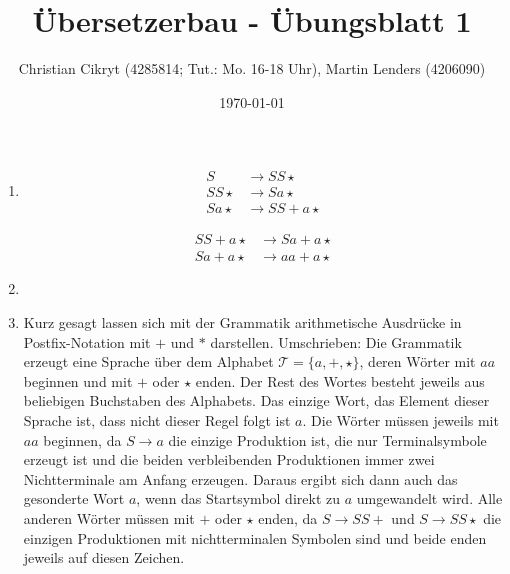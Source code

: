 \documentclass[a4paper,10pt]{scrartcl}
\title{Übersetzerbau - Übungsblatt 1}
\author{Christian Cikryt (4285814; Tut.: Mo. 16-18 Uhr), Martin Lenders (4206090)}
\date{\today}
\begin{document}
\maketitle

\section{}
\begin{enumerate}
 \item	\begin{minipage}[t]{0.4\textwidth}
	  \begin{align*}
	    S & \to SS\star \tag{$S \to SS\star$} \\
	    SS\star & \to Sa\star \tag{$S \to a$} \\
	    Sa\star & \to SS+a\star \tag{$S \to SS+$}
	  \end{align*}
	\end{minipage}
	\begin{minipage}[t]{0.4\textwidth}
	  \begin{align*}
	    SS+a\star & \to Sa+a\star \tag{$S \to a$} \\
	    Sa+a\star & \to aa+a\star \tag{$S \to a$}
	  \end{align*}
	\end{minipage}
 \item	\begin{minipage}[t]{0.8\textwidth}
	  \centering
	\end{minipage}
 \item	Kurz gesagt lassen sich mit der Grammatik arithmetische Ausdrücke in Postfix-Notation mit $+$ und $*$ darstellen.
	Umschrieben: Die Grammatik erzeugt eine Sprache über dem Alphabet $\mathcal{T} = \{a,
	+, \star\}$, deren Wörter mit $aa$ beginnen und mit $+$ oder $\star$
  enden.
	Der Rest des Wortes besteht jeweils aus beliebigen Buchstaben des
  Alphabets.
	Das einzige Wort, das Element dieser Sprache ist, dass nicht dieser
Regel folgt ist $a$.
	Die Wörter müssen jeweils mit $aa$ beginnen, da $S \to a$ die einzige
	Produktion ist, die nur Terminalsymbole erzeugt ist und die beiden
	verbleibenden Produktionen immer zwei Nichtterminale am Anfang erzeugen.
	Daraus ergibt sich dann auch das gesonderte Wort $a$, wenn das
Startsymbol direkt zu $a$ umgewandelt wird. 
	Alle anderen Wörter müssen mit $+$ oder $\star$ enden, da $S \to SS+$
und $S \to SS\star$ die einzigen Produktionen mit nichtterminalen Symbolen sind
 und beide enden jeweils auf diesen Zeichen.
\end{enumerate}
\end{document}
